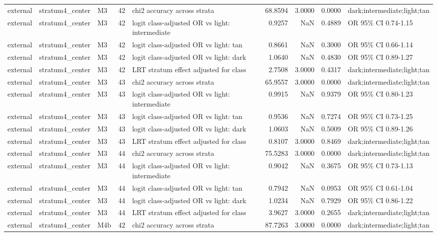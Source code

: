 \begin{tabular}{lllrlrrrl}
external & stratum4\_center & M3 & 42 & chi2 accuracy across strata & 68.8594 & 3.0000 & 0.0000 & dark;intermediate;light;tan \\
external & stratum4\_center & M3 & 42 & logit class-adjusted OR vs light: intermediate & 0.9257 & NaN & 0.4889 & OR 95\% CI 0.74-1.15 \\
external & stratum4\_center & M3 & 42 & logit class-adjusted OR vs light: tan & 0.8661 & NaN & 0.3000 & OR 95\% CI 0.66-1.14 \\
external & stratum4\_center & M3 & 42 & logit class-adjusted OR vs light: dark & 1.0640 & NaN & 0.4830 & OR 95\% CI 0.89-1.27 \\
external & stratum4\_center & M3 & 42 & LRT stratum effect adjusted for class & 2.7508 & 3.0000 & 0.4317 & dark;intermediate;light;tan \\
external & stratum4\_center & M3 & 43 & chi2 accuracy across strata & 65.9557 & 3.0000 & 0.0000 & dark;intermediate;light;tan \\
external & stratum4\_center & M3 & 43 & logit class-adjusted OR vs light: intermediate & 0.9915 & NaN & 0.9379 & OR 95\% CI 0.80-1.23 \\
external & stratum4\_center & M3 & 43 & logit class-adjusted OR vs light: tan & 0.9536 & NaN & 0.7274 & OR 95\% CI 0.73-1.25 \\
external & stratum4\_center & M3 & 43 & logit class-adjusted OR vs light: dark & 1.0603 & NaN & 0.5009 & OR 95\% CI 0.89-1.26 \\
external & stratum4\_center & M3 & 43 & LRT stratum effect adjusted for class & 0.8107 & 3.0000 & 0.8469 & dark;intermediate;light;tan \\
external & stratum4\_center & M3 & 44 & chi2 accuracy across strata & 75.5283 & 3.0000 & 0.0000 & dark;intermediate;light;tan \\
external & stratum4\_center & M3 & 44 & logit class-adjusted OR vs light: intermediate & 0.9042 & NaN & 0.3675 & OR 95\% CI 0.73-1.13 \\
external & stratum4\_center & M3 & 44 & logit class-adjusted OR vs light: tan & 0.7942 & NaN & 0.0953 & OR 95\% CI 0.61-1.04 \\
external & stratum4\_center & M3 & 44 & logit class-adjusted OR vs light: dark & 1.0234 & NaN & 0.7929 & OR 95\% CI 0.86-1.22 \\
external & stratum4\_center & M3 & 44 & LRT stratum effect adjusted for class & 3.9627 & 3.0000 & 0.2655 & dark;intermediate;light;tan \\
external & stratum4\_center & M4b & 42 & chi2 accuracy across strata & 87.7263 & 3.0000 & 0.0000 & dark;intermediate;light;tan \\

\end{tabular}

